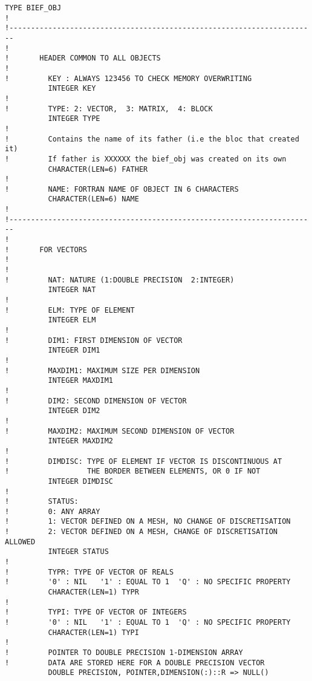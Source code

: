 \begin{lstlisting}[language=TelFortran]
        TYPE BIEF_OBJ
!
!-----------------------------------------------------------------------
!
!       HEADER COMMON TO ALL OBJECTS
!
!         KEY : ALWAYS 123456 TO CHECK MEMORY OVERWRITING
          INTEGER KEY
!
!         TYPE: 2: VECTOR,  3: MATRIX,  4: BLOCK
          INTEGER TYPE
!
!         Contains the name of its father (i.e the bloc that created it)
!         If father is XXXXXX the bief_obj was created on its own
          CHARACTER(LEN=6) FATHER
!
!         NAME: FORTRAN NAME OF OBJECT IN 6 CHARACTERS
          CHARACTER(LEN=6) NAME
!
!-----------------------------------------------------------------------
!
!       FOR VECTORS
!
!
!         NAT: NATURE (1:DOUBLE PRECISION  2:INTEGER)
          INTEGER NAT
!
!         ELM: TYPE OF ELEMENT
          INTEGER ELM
!
!         DIM1: FIRST DIMENSION OF VECTOR
          INTEGER DIM1
!
!         MAXDIM1: MAXIMUM SIZE PER DIMENSION
          INTEGER MAXDIM1
!
!         DIM2: SECOND DIMENSION OF VECTOR
          INTEGER DIM2
!
!         MAXDIM2: MAXIMUM SECOND DIMENSION OF VECTOR
          INTEGER MAXDIM2
!
!         DIMDISC: TYPE OF ELEMENT IF VECTOR IS DISCONTINUOUS AT
!                  THE BORDER BETWEEN ELEMENTS, OR 0 IF NOT
          INTEGER DIMDISC
!
!         STATUS:
!         0: ANY ARRAY
!         1: VECTOR DEFINED ON A MESH, NO CHANGE OF DISCRETISATION
!         2: VECTOR DEFINED ON A MESH, CHANGE OF DISCRETISATION ALLOWED
          INTEGER STATUS
!
!         TYPR: TYPE OF VECTOR OF REALS
!         '0' : NIL   '1' : EQUAL TO 1  'Q' : NO SPECIFIC PROPERTY
          CHARACTER(LEN=1) TYPR
!
!         TYPI: TYPE OF VECTOR OF INTEGERS
!         '0' : NIL   '1' : EQUAL TO 1  'Q' : NO SPECIFIC PROPERTY
          CHARACTER(LEN=1) TYPI
!
!         POINTER TO DOUBLE PRECISION 1-DIMENSION ARRAY
!         DATA ARE STORED HERE FOR A DOUBLE PRECISION VECTOR
          DOUBLE PRECISION, POINTER,DIMENSION(:)::R => NULL()


\end{lstlisting}
